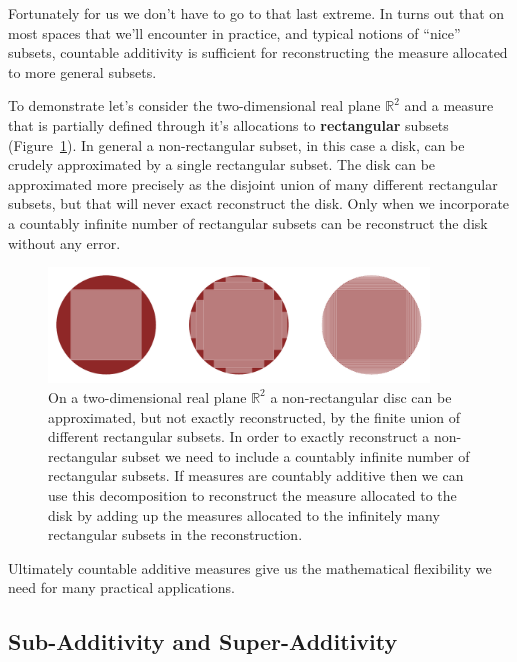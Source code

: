 \documentclass[
  letterpaper,
  DIV=11,
  numbers=noendperiod]{scrartcl}
\begin{document}
Fortunately for us we don't have to go to that last extreme. In turns
out that on most spaces that we'll encounter in practice, and typical
notions of ``nice'' subsets, countable additivity is sufficient for
reconstructing the measure allocated to more general subsets.

To demonstrate let's consider the two-dimensional real plane
\(\mathbb{R}^{2}\) and a measure that is partially defined through it's
allocations to \textbf{rectangular} subsets
(Figure~\ref{fig-disk-decomposition}). In general a non-rectangular
subset, in this case a disk, can be crudely approximated by a single
rectangular subset. The disk can be approximated more precisely as the
disjoint union of many different rectangular subsets, but that will
never exact reconstruct the disk. Only when we incorporate a countably
infinite number of rectangular subsets can be reconstruct the disk
without any error.

\begin{figure}

{\centering \includegraphics[width=0.9\textwidth,height=\textheight]{figures/disk_decomposition/disk_decomposition.pdf}

}

\caption{\label{fig-disk-decomposition}On a two-dimensional real plane
\(\mathbb{R}^{2}\) a non-rectangular disc can be approximated, but not
exactly reconstructed, by the finite union of different rectangular
subsets. In order to exactly reconstruct a non-rectangular subset we
need to include a countably infinite number of rectangular subsets. If
measures are countably additive then we can use this decomposition to
reconstruct the measure allocated to the disk by adding up the measures
allocated to the infinitely many rectangular subsets in the
reconstruction.}

\end{figure}

Ultimately countable additive measures give us the mathematical
flexibility we need for many practical applications.

\hypertarget{sub-additivity-and-super-additivity}{%
\subsection{Sub-Additivity and
Super-Additivity}\label{sub-additivity-and-super-additivity}}
\end{document}

